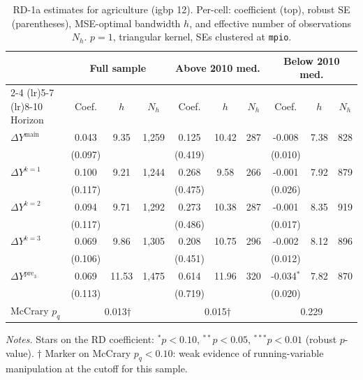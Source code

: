 \documentclass[11pt]{article}
\begin{document}
\begin{table}[H]
\centering
\scriptsize
\caption{RD-1a estimates for agriculture (igbp 12). Per-cell: coefficient
(top), robust SE (parentheses), MSE-optimal bandwidth $h$, and
effective number of observations $N_h$. $p=1$, triangular kernel,
SEs clustered at \texttt{mpio}.}
\label{tab:rdplot_rd1a_agriculture}
\begin{tabular}{l ccc ccc ccc}
\toprule
 & \multicolumn{3}{c}{Full sample} & \multicolumn{3}{c}{Above 2010 med.} & \multicolumn{3}{c}{Below 2010 med.} \\
\cmidrule(lr){2-4} \cmidrule(lr){5-7} \cmidrule(lr){8-10}
Horizon & Coef. & $h$ & $N_h$ & Coef. & $h$ & $N_h$ & Coef. & $h$ & $N_h$ \\
\midrule
$\Delta Y^{\text{main}}$ & 0.043 & 9.35 & 1,259 & 0.125 & 10.42 & 287 & -0.008 & 7.38 & 828 \\
 & (0.097) &  &  & (0.419) &  &  & (0.010) &  &  \\
\addlinespace[1pt]
$\Delta Y^{k=1}$ & 0.100 & 9.21 & 1,244 & 0.268 & 9.58 & 266 & -0.001 & 7.92 & 879 \\
 & (0.117) &  &  & (0.475) &  &  & (0.026) &  &  \\
\addlinespace[1pt]
$\Delta Y^{k=2}$ & 0.094 & 9.71 & 1,292 & 0.273 & 10.38 & 287 & -0.001 & 8.35 & 919 \\
 & (0.117) &  &  & (0.486) &  &  & (0.017) &  &  \\
\addlinespace[1pt]
$\Delta Y^{k=3}$ & 0.069 & 9.86 & 1,305 & 0.208 & 10.75 & 296 & -0.002 & 8.12 & 896 \\
 & (0.106) &  &  & (0.451) &  &  & (0.012) &  &  \\
\addlinespace[1pt]
$\Delta Y^{\text{pre}_3}$ & 0.069 & 11.53 & 1,475 & 0.614 & 11.96 & 320 & -0.034$^{*}$ & 7.82 & 870 \\
 & (0.113) &  &  & (0.719) &  &  & (0.020) &  &  \\
\addlinespace[1pt]
\midrule
McCrary $p_q$ & \multicolumn{3}{c}{0.013$\dagger$} & \multicolumn{3}{c}{0.015$\dagger$} & \multicolumn{3}{c}{0.229} \\
\bottomrule
\end{tabular}
\begin{flushleft}\footnotesize
\textit{Notes.} Stars on the RD coefficient: $^{*}p<0.10$,
$^{**}p<0.05$, $^{***}p<0.01$ (robust $p$-value).
$\dagger$ Marker on McCrary $p_q<0.10$: weak evidence of running-variable manipulation at the cutoff for this sample.\\
\end{flushleft}
\end{table}
\end{document}
